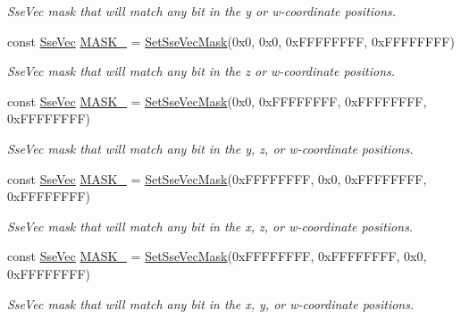 \begin{DoxyCompactItemize}
\begin{DoxyCompactList}\small\item\em Sse\+Vec mask that will match any bit in the y or w-\/coordinate positions. \end{DoxyCompactList}\item 
const \hyperlink{namespacegofxmath_a634570ddcd2496053ee966227080e02f}{Sse\+Vec} \hyperlink{namespacegofxmath_ab4d2ad1ff23d4e35a2cb19a3be6dbe19}{M\+A\+S\+K\+\_} = \hyperlink{namespacegofxmath_a00fde6f7347c3610a9b6184079d6490e}{Set\+Sse\+Vec\+Mask}(0x0, 0x0, 0x\+F\+F\+F\+F\+F\+F\+F\+F, 0x\+F\+F\+F\+F\+F\+F\+F\+F)
\begin{DoxyCompactList}\small\item\em Sse\+Vec mask that will match any bit in the z or w-\/coordinate positions. \end{DoxyCompactList}\item 
const \hyperlink{namespacegofxmath_a634570ddcd2496053ee966227080e02f}{Sse\+Vec} \hyperlink{namespacegofxmath_a26899473d5a93ecf33fbdeb7bf332890}{M\+A\+S\+K\+\_} = \hyperlink{namespacegofxmath_a00fde6f7347c3610a9b6184079d6490e}{Set\+Sse\+Vec\+Mask}(0x0, 0x\+F\+F\+F\+F\+F\+F\+F\+F, 0x\+F\+F\+F\+F\+F\+F\+F\+F, 0x\+F\+F\+F\+F\+F\+F\+F\+F)
\begin{DoxyCompactList}\small\item\em Sse\+Vec mask that will match any bit in the y, z, or w-\/coordinate positions. \end{DoxyCompactList}\item 
const \hyperlink{namespacegofxmath_a634570ddcd2496053ee966227080e02f}{Sse\+Vec} \hyperlink{namespacegofxmath_a93d32bd94a23c12d1e647ec1d5e25303}{M\+A\+S\+K\+\_} = \hyperlink{namespacegofxmath_a00fde6f7347c3610a9b6184079d6490e}{Set\+Sse\+Vec\+Mask}(0x\+F\+F\+F\+F\+F\+F\+F\+F, 0x0, 0x\+F\+F\+F\+F\+F\+F\+F\+F, 0x\+F\+F\+F\+F\+F\+F\+F\+F)
\begin{DoxyCompactList}\small\item\em Sse\+Vec mask that will match any bit in the x, z, or w-\/coordinate positions. \end{DoxyCompactList}\item 
const \hyperlink{namespacegofxmath_a634570ddcd2496053ee966227080e02f}{Sse\+Vec} \hyperlink{namespacegofxmath_af1a1ed503168492328267f3064cde68d}{M\+A\+S\+K\+\_} = \hyperlink{namespacegofxmath_a00fde6f7347c3610a9b6184079d6490e}{Set\+Sse\+Vec\+Mask}(0x\+F\+F\+F\+F\+F\+F\+F\+F, 0x\+F\+F\+F\+F\+F\+F\+F\+F, 0x0, 0x\+F\+F\+F\+F\+F\+F\+F\+F)
\begin{DoxyCompactList}\small\item\em Sse\+Vec mask that will match any bit in the x, y, or w-\/coordinate positions. \end{DoxyCompactList}\item 

\end{DoxyCompactItemize}
